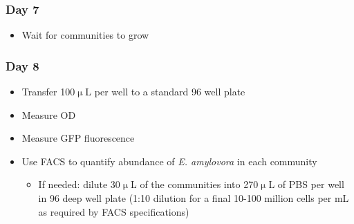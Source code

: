 \documentclass[a4paper,10pt]{article}
\begin{document}
\subsubsection*{Day 7}

\begin{itemize}[label=\Square]

\item Wait for communities to grow

\end{itemize}

\subsubsection*{Day 8}

\begin{itemize}[label=\Square]

\item Transfer 100$\upmu$L per well to a standard 96 well plate
\item Measure OD
\item Measure GFP fluorescence
\item Use FACS to quantify abundance of \textit{E. amylovora} in each community
\begin{itemize}[label=\Square]
\item If needed: dilute 30$\upmu$L of the communities into 270$\upmu$L of PBS
per well in 96 deep well plate (1:10 dilution for a final 10-100 million cells
per mL as required by FACS specifications)
\end{itemize}


\end{itemize}
\end{document}
